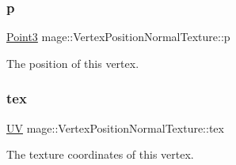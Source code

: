 \subsubsection{\texorpdfstring{p}{p}}
{\footnotesize\ttfamily \hyperlink{structmage_1_1_point3}{Point3} mage\+::\+Vertex\+Position\+Normal\+Texture\+::p}

The position of this vertex. \hypertarget{structmage_1_1_vertex_position_normal_texture_a0782e41c5e28d421bfb47afad9af9c55}{}\label{structmage_1_1_vertex_position_normal_texture_a0782e41c5e28d421bfb47afad9af9c55} 
\subsubsection{\texorpdfstring{tex}{tex}}
{\footnotesize\ttfamily \hyperlink{structmage_1_1_u_v}{UV} mage\+::\+Vertex\+Position\+Normal\+Texture\+::tex}

The texture coordinates of this vertex. 